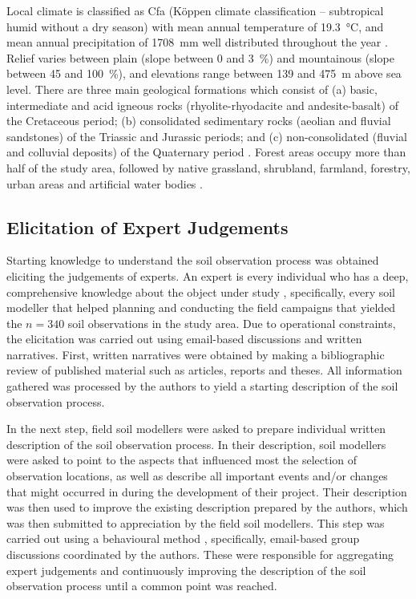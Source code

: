 Local climate is classified as Cfa (K{\"o}ppen climate classification -- subtropical humid without a dry 
season) with mean annual temperature of \SI{19.3}{\celsius}, and mean annual precipitation of \SI{1708}{\mm} 
well distributed throughout the year \cite{Maluf2000}. Relief varies between plain (slope between \num{0} and 
\SI{3}{\percent}) and mountainous (slope between \num{45} and \SI{100}{\percent}), and elevations range 
between \num{139} and \SI{475}{\m} above sea level. There are three main geological formations which consist 
of (a) basic, intermediate and acid igneous rocks (rhyolite-rhyodacite and andesite-basalt) of the Cretaceous 
period; (b) consolidated sedimentary rocks (aeolian and fluvial sandstones) of the Triassic and Jurassic 
periods; and (c) non-consolidated (fluvial and colluvial deposits) of the Quaternary period 
\cite{GasparettoEtAl1988, MacielFilho1990, Sartori2009}. Forest areas occupy more than half of the study area, 
followed by native grassland, shrubland, farmland, forestry, urban areas and artificial water bodies 
\cite{SamuelRosaEtAl2011a}.

\subsection{Elicitation of Expert Judgements}

Starting knowledge to understand the soil observation process was obtained eliciting the judgements of 
experts. An expert is every individual who has a deep, comprehensive knowledge about the object under study 
\cite{MeyerEtAl2001}, specifically, every soil modeller that helped planning and conducting the field 
campaigns that yielded the $n = 340$ soil observations in the study area. Due to operational constraints, the 
elicitation was carried out using email-based discussions and written narratives. First, written narratives 
were obtained by making a bibliographic review of published material such as articles, reports and theses. All 
information gathered was processed by the authors to yield a starting description of the soil observation 
process.

In the next step, field soil modellers were asked to prepare individual written description of the soil 
observation process. In their description, soil modellers were asked to point to the aspects that influenced 
most the selection of observation locations, as well as describe all important events and/or changes that 
might occurred in during the development of their project. Their description was then used to improve the 
existing description prepared by the authors, which was then submitted to appreciation by the field soil 
modellers. This step was carried out using a behavioural method \cite{OrsiEtAl2011}, specifically, email-based 
group discussions coordinated by the authors. These were responsible for aggregating expert judgements and 
continuously improving the description of the soil observation process until a common point was reached.

